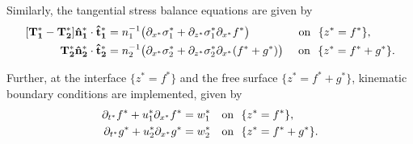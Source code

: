 \documentclass[11pt]{article}
\numberwithin{equation}{section}
\newtheorem{counter example}[theorem]{Counter Example}
\begin{document}
{Similarly, the tangential stress balance equations are given by
\begin{align}\label{eq: 10}
    \mathbf{[T_1^* -T_2^*]\hat{n}_1^*\cdot \hat{t}_1^*}&=   n^{-1}_1 \big(  {\partial_{x^*} \sigma_1^*+\partial_{z^*} \sigma_1^*\partial_{x^*} f^*} \big)%
 ~ \qquad\qquad\mathrm{on}~~\{z^*=f^*\},\vspace{0.1 cm}\\
    \hspace{1.1 cm}\mathbf{T_2^*\hat{n}_2^*\cdot \hat{t}_2^*}&= n^{-1}_2 \big( {\partial_{x^*} \sigma_2^*+\partial_{z^*} \sigma_2^*\partial_{x^*} (f^*+g^*)}\big) 
    ~~~~\mathrm{on}~~\{z^*=f^*+g^*\}.\nonumber
\end{align}


Further, at the interface $\{z^*=f^*\}$ and the free surface $\{z^*=f^*+g^*\}$, kinematic boundary conditions are implemented, given by
\begin{align}
\partial_{t^*} f^*+u_1^*\partial_{x^*} f^*&=w_1^*~~~\mathrm{on}~~\{z^*=f^*\},\vspace{0.3 cm}\\
\partial_{t^*} g^*+u_2^*\partial_{x^*} g^*&=w_2^*~~~\mathrm{on}~~\{z^*=f^*+g^*\}.\nonumber
\end{align}

}
\end{document}
